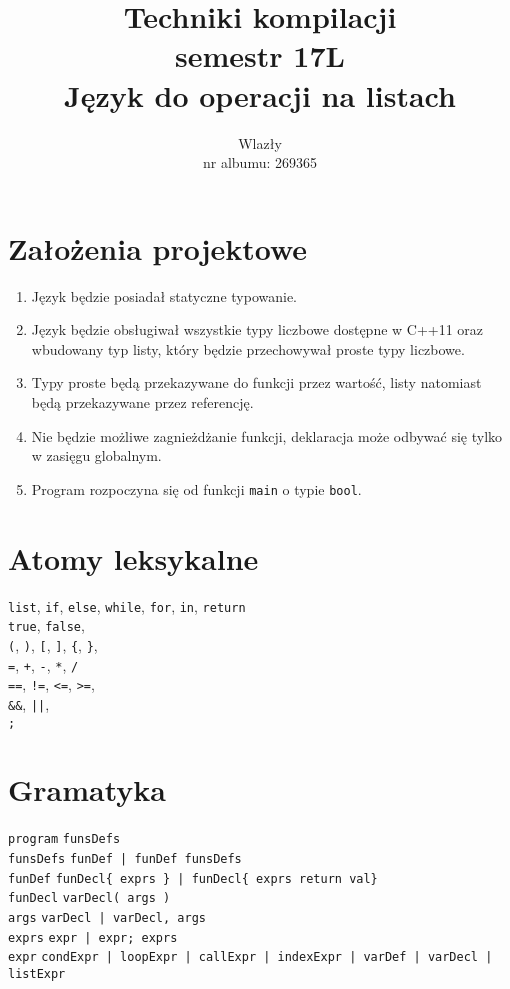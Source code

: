\documentclass{article}
\title{\vspace{7cm}\LARGE Techniki kompilacji\\semestr 17L\\Język do operacji na listach}
\author{\LargeŁukasz Wlazły\\nr albumu: 269365}
\date{}
\newcommand{\keyword}[1]{\colorbox{light-gray}{\texttt{#1}}}
\newcommand{\code}[1]{\texttt{#1}}
\begin{document}
\maketitle
{}
\newpage
{}

\section{Założenia projektowe}
\begin{enumerate}
\item Język będzie posiadał statyczne typowanie.
\item Język będzie obsługiwał wszystkie typy liczbowe dostępne w C++11 oraz wbudowany typ listy, który będzie przechowywał proste typy liczbowe.
\item Typy proste będą przekazywane do funkcji przez wartość, listy natomiast będą przekazywane przez referencję.
\item Nie będzie możliwe zagnieżdżanie funkcji, deklaracja może odbywać się tylko w zasięgu globalnym.
\item Program rozpoczyna się od funkcji \code{main} o typie \code{bool}.
\end{enumerate}

\section{Atomy leksykalne}
\keyword{list}, \keyword{if}, \keyword{else}, \keyword{while}, \keyword{for}, \keyword{in}, \keyword{return}\\
\keyword{true}, \keyword{false}, \\
\keyword{(}, \keyword{)}, \keyword{[}, \keyword{]}, \keyword{\{}, \keyword{\}}, \\
\keyword{=}, \keyword{+}, \keyword{-}, \keyword{*}, \keyword{/} \\
\keyword{==}, \keyword{!=}, \keyword{<=}, \keyword{>=}, \\
\keyword{\&\&}, \keyword{||}, \\
\keyword{;}

\section{Gramatyka}
\code{program} \textrightarrow \code{funsDefs} \\
\code{funsDefs} \textrightarrow \code{funDef | funDef funsDefs} \\
\code{funDef} \textrightarrow \code{funDecl\{ exprs \} | funDecl\{ exprs return val\}} \\
\code{funDecl} \textrightarrow \code{varDecl( args )} \\
\code{args} \textrightarrow \code{varDecl | varDecl, args} \\
\code{exprs} \textrightarrow \code{expr | expr\keyword{;} exprs} \\
\code{expr} \textrightarrow \code{condExpr | loopExpr | callExpr | indexExpr | varDef | varDecl | listExpr} \\
\end{document}
